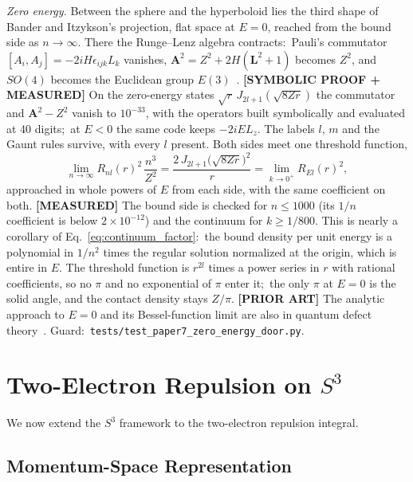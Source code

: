 \documentclass[aps,pra,twocolumn,superscriptaddress,longbibliography]{revtex4-2}
\begin{document}
\emph{Zero energy.} Between the sphere and the hyperboloid lies the third shape of Bander and Itzykson's projection, flat space at $E = 0$, reached from the bound side as $n \to \infty$. There the Runge--Lenz algebra contracts:\ Pauli's commutator $[A_i, A_j] = -2iH\epsilon_{ijk}L_k$ vanishes, $\mathbf{A}^2 = Z^2 + 2H(\mathbf{L}^2+1)$ becomes $Z^2$, and $SO(4)$ becomes the Euclidean group $E(3)$~\cite{pauli1926}. \textbf{[SYMBOLIC PROOF + MEASURED]} On the zero-energy states $\sqrt{r}\,J_{2l+1}(\sqrt{8Zr})$ the commutator and $\mathbf{A}^2 - Z^2$ vanish to $10^{-33}$, with the operators built symbolically and evaluated at 40 digits;\ at $E < 0$ the same code keeps $-2iE L_z$. The labels $l$, $m$ and the Gaunt rules survive, with every $l$ present. Both sides meet one threshold function,
\begin{equation}
\lim_{n\to\infty} R_{nl}(r)^2\,\frac{n^3}{Z^2} = \frac{2\,J_{2l+1}\bigl(\sqrt{8Zr}\bigr)^2}{r} = \lim_{k\to 0^+} R_{El}(r)^2 ,
\label{eq:zero_energy}
\end{equation}
approached in whole powers of $E$ from each side, with the same coefficient on both. \textbf{[MEASURED]} The bound side is checked for $n \le 1000$ (its $1/n$ coefficient is below $2\times 10^{-12}$) and the continuum for $k \ge 1/800$. This is nearly a corollary of Eq.~\eqref{eq:continuum_factor}:\ the bound density per unit energy is a polynomial in $1/n^2$ times the regular solution normalized at the origin, which is entire in $E$. The threshold function is $r^{2l}$ times a power series in $r$ with rational coefficients, so no $\pi$ and no exponential of $\pi$ enter it;\ the only $\pi$ at $E = 0$ is the solid angle, and the contact density stays $Z/\pi$. \textbf{[PRIOR ART]} The analytic approach to $E = 0$ and its Bessel-function limit are also in quantum defect theory~\cite{Seaton1983}. Guard:\ \texttt{tests/test\_paper7\_zero\_energy\_door.py}.


\section{Two-Electron Repulsion on $S^3$}
\label{sec:vee_s3}

We now extend the $S^3$ framework to the two-electron repulsion
integral.

\subsection{Momentum-Space Representation}
\end{document}
